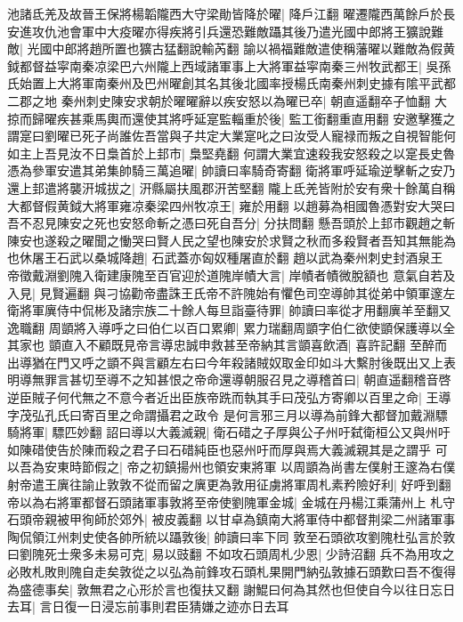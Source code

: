 池諸氐羌及故晉王保將楊韜隴西大守梁勛皆降於曜|{
	降戶江翻}
曜遷隴西萬餘戶於長安進攻仇池會軍中大疫曜亦得疾將引兵還恐難敵躡其後乃遣光國中郎將王獷說難敵|{
	光國中郎將趙所置也獷古猛翻說輸芮翻}
諭以禍福難敵遣使稱藩曜以難敵為假黄鉞都督益寜南秦凉梁巴六州隴上西域諸軍事上大將軍益寜南秦三州牧武都王|{
	吳孫氏始置上大將軍南秦州及巴州曜創其名其後北國率授楊氏南秦州刺史據有隂平武都二郡之地}
秦州刺史陳安求朝於曜曜辭以疾安怒以為曜已卒|{
	朝直遥翻卒子恤翻}
大掠而歸曜疾甚乘馬輿而還使其將呼延寔監輜重於後|{
	監工銜翻重直用翻}
安邀擊獲之謂寔曰劉曜已死子尚誰佐吾當與子共定大業寔叱之曰汝受人寵禄而叛之自視智能何如主上吾見汝不日梟首於上邽市|{
	梟堅堯翻}
何謂大業宜速殺我安怒殺之以寔長史魯憑為參軍安遣其弟集帥騎三萬追曜|{
	帥讀曰率騎奇寄翻}
衛將軍呼延瑜逆擊斬之安乃還上邽遣將襲汧城拔之|{
	汧縣屬扶風郡汧苦堅翻}
隴上氐羌皆附於安有衆十餘萬自稱大都督假黄鉞大將軍雍凉秦梁四州牧凉王|{
	雍於用翻}
以趙募為相國魯憑對安大哭曰吾不忍見陳安之死也安怒命斬之憑曰死自吾分|{
	分扶問翻}
懸吾頭於上邽市觀趙之斬陳安也遂殺之曜聞之慟哭曰賢人民之望也陳安於求賢之秋而多殺賢者吾知其無能為也休屠王石武以桑城降趙|{
	石武蓋亦匈奴種屠直於翻}
趙以武為秦州刺史封酒泉王　帝徵戴淵劉隗入衛建康隗至百官迎於道隗岸幘大言|{
	岸幘者幘微脫額也}
意氣自若及入見|{
	見賢遍翻}
與刁協勸帝盡誅王氏帝不許隗始有懼色司空導帥其從弟中領軍邃左衛將軍廙侍中侃彬及諸宗族二十餘人每旦詣臺待罪|{
	帥讀曰率從才用翻廙羊至翻又逸職翻}
周顗將入導呼之曰伯仁以百口累卿|{
	累力瑞翻周顗字伯仁欲使顗保護導以全其家也}
顗直入不顧既見帝言導忠誠申救甚至帝納其言顗喜飲酒|{
	喜許記翻}
至醉而出導猶在門又呼之顗不與言顧左右曰今年殺諸賊奴取金印如斗大繫肘後既出又上表明導無罪言甚切至導不之知甚恨之帝命還導朝服召見之導稽首曰|{
	朝直遥翻稽音啓}
逆臣賊子何代無之不意今者近出臣族帝跣而執其手曰茂弘方寄卿以百里之命|{
	王導字茂弘孔氏曰寄百里之命謂攝君之政令}
是何言邪三月以導為前鋒大都督加戴淵驃騎將軍|{
	驃匹妙翻}
詔曰導以大義滅親|{
	衛石碏之子厚與公子州吁弑衛桓公又與州吁如陳碏使告於陳而殺之君子曰石碏純臣也惡州吁而厚與焉大義滅親其是之謂乎}
可以吾為安東時節假之|{
	帝之初鎮揚州也領安東將軍}
以周顗為尚書左僕射王邃為右僕射帝遣王廙往諭止敦敦不從而留之廙更為敦用征虜將軍周札素矜險好利|{
	好呼到翻}
帝以為右將軍都督石頭諸軍事敦將至帝使劉隗軍金城|{
	金城在丹楊江乘蒲州上}
札守石頭帝親被甲徇師於郊外|{
	被皮義翻}
以甘卓為鎮南大將軍侍中都督荆梁二州諸軍事陶侃領江州刺史使各帥所統以躡敦後|{
	帥讀曰率下同}
敦至石頭欲攻劉隗杜弘言於敦曰劉隗死士衆多未易可克|{
	易以豉翻}
不如攻石頭周札少恩|{
	少詩沼翻}
兵不為用攻之必敗札敗則隗自走矣敦從之以弘為前鋒攻石頭札果開門納弘敦據石頭歎曰吾不復得為盛德事矣|{
	敦無君之心形於言也復扶又翻}
謝鯤曰何為其然也但使自今以往日忘日去耳|{
	言日復一日浸忘前事則君臣猜嫌之迹亦日去耳}
